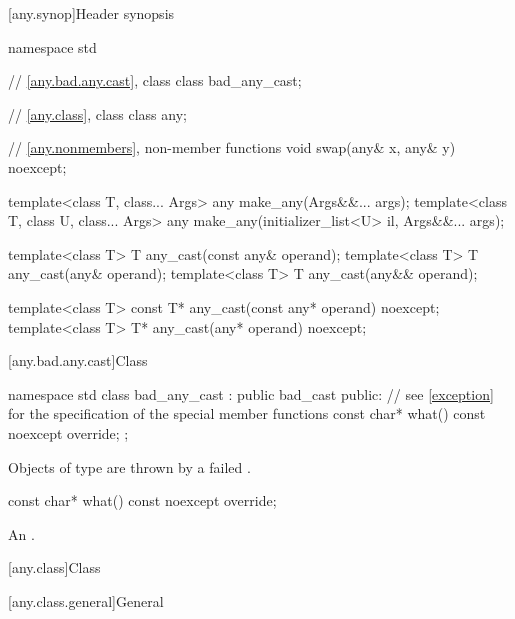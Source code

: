 [any.synop]{Header  synopsis}

%

\begin{codeblock}
namespace std {
  // \ref{any.bad.any.cast}, class 
  class bad_any_cast;

  // \ref{any.class}, class 
  class any;

  // \ref{any.nonmembers}, non-member functions
  void swap(any& x, any& y) noexcept;

  template<class T, class... Args>
    any make_any(Args&&... args);
  template<class T, class U, class... Args>
    any make_any(initializer_list<U> il, Args&&... args);

  template<class T>
    T any_cast(const any& operand);
  template<class T>
    T any_cast(any& operand);
  template<class T>
    T any_cast(any&& operand);

  template<class T>
    const T* any_cast(const any* operand) noexcept;
  template<class T>
    T* any_cast(any* operand) noexcept;
}
\end{codeblock}

[any.bad.any.cast]{Class }

%
\begin{codeblock}
namespace std {
  class bad_any_cast : public bad_cast {
  public:
    // see \ref{exception} for the specification of the special member functions
    const char* what() const noexcept override;
  };
}
\end{codeblock}

\pnum
Objects of type  are thrown by a failed .

%
\begin{itemdecl}
const char* what() const noexcept override;
\end{itemdecl}

\begin{itemdescr}
\pnum
\returns
An  \ntbs{}.
\end{itemdescr}

[any.class]{Class }

[any.class.general]{General}

